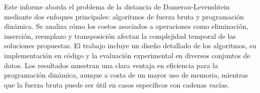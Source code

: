 Este informe aborda el problema de la distancia de Damerau-Levenshtein mediante dos enfoques principales: 
algoritmos de fuerza bruta y programación dinámica. Se analiza cómo los costos asociados a operaciones como eliminación,
inserción, reemplazo y transposición afectan la complejidad temporal de las soluciones propuestas. El trabajo incluye un diseño 
detallado de los algoritmos, su implementación en código y la evaluación experimental en diversos conjuntos de datos. Los resultados 
muestran una clara ventaja en eficiencia para la programación dinámica, aunque a costa de un mayor uso de memoria, mientras que la 
fuerza bruta puede ser útil en casos específicos con cadenas vacías.

